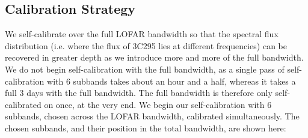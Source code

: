 \subsection{Calibration Strategy}

\pg
We self-calibrate over the full LOFAR bandwidth so that the spectral flux distribution (i.e. where the flux of 3C295 lies at different frequencies) can be recovered in greater depth as we introduce more and more of the full bandwidth. We do not begin self-calibration with the full bandwidth, as a single pass of self-calibration with 6 subbands takes about an hour and a half, whereas it takes a full 3 days with the full bandwidth. The full bandwidth is therefore only self-calibrated on once, at the very end. We begin our self-calibration with 6 subbands, chosen across the LOFAR bandwidth, calibrated simultaneously. The chosen subbands, and their position in the total bandwidth, are shown here:
\begin{figure}[h]
\begin{floatrow}
\end{floatrow}
\end{figure}

